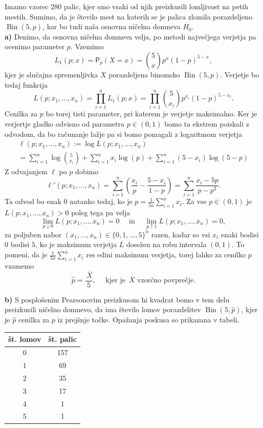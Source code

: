\documentclass[a4paper,11pt]{article}
\newcommand{\olsi}[1]{\,\overline{\!{#1}}} %
\newcommand{\sumin}{\sum_{i = 1}^n}
\DeclareMathOperator{\bin}{Bin}
\begin{document}
Imamo vzorec $280$ palic, kjer smo vsaki od njih preizkusili lomljivost na petih mestih. Sumimo, da je število mest na katerih se je palica zlomila porazdeljeno $\bin(5,p)$, kar bo tudi naša osnovna ničelna domneva $H_0$.
\\

\noindent
\textbf{a)} Denimo, da osnovna ničelna domneva velja, po metodi največjega verjetja pa ocenimo parameter $p$. Vzemimo
\[
    L_1(p; x) = \mathsf{P}_p(X = x) = \binom{5}{x}p^x(1-p)^{5 - x},
\]
kjer je slučajna spremenljivka $X$ porazdeljena binomsko $\bin(5,p)$. Verjetje bo tedaj funkcija
\[
    L(p; x_1, \ldots, x_n) = \prod_{i = 1}^n L_1(p; x) = \prod_{i = 1}^n \binom{5}{x_i}p^{x_i}(1-p)^{5 - x_i}.
\]
Cenilka za $p$ bo torej tisti parameter, pri katerem je verjetje maksimalno. Ker je verjertje gladko odvisno od parametra $p \in (0,1)$ bomo ta ekstrem poiskali z odvodom, da bo računanje lažje pa si bomo pomagali z logaritmom verjetja
\begin{multline*}
    \ell(p; x_1, \ldots, x_n) := 
    \log L(p; x_1, \ldots, x_n) \\ 
    = \sumin \log\binom{5}{x_i} + \sumin x_i\log(p) + \sumin(5 - x_i) \log(5 - p)
\end{multline*}
Z odvajanjem $\ell$ po $p$ dobimo
\[
    \ell'(p; x_1, \ldots, x_n) =
    \sumin \left( \frac{x_i}{p} - \frac{5 - x_i}{1 - p}\right) = 
    \sumin \frac{x_i - 5p}{p - p^2}.
\]
Ta odvod bo enak $0$ natanko tedaj, ko je $p = \frac{1}{5n} \sumin x_i$. Za vse $p \in (0,1)$ je $L(p; x_1, \ldots, x_n) > 0$ poleg tega pa velja
\[
    \lim_{p \downarrow  0} L(p; x_1, \ldots, x_n) = 0 \quad \text{ in } \quad 
    \lim_{p \uparrow  1} L(p; x_1, \ldots, x_n) = 0,
\]
za poljuben nabor $(x_1, \ldots, x_n) \in \{0,1,\ldots, 5\}^n$ razen, kadar so vsi $x_i$ enaki bodisi $0$ bodisi $5$, ko je maksimum verjetja $L$ dosežen na robu intervala $(0,1)$. To pomeni, da je $\frac{1}{5n} \sumin x_i$ res edini maksimum verjetja, torej lahko za cenilko $p$ vzamemo  
\[
    \hat{p} = \frac{\olsi{X}}{5}, \quad \text{ kjer je $\olsi{X}$ vzorčno povprečje.}  
\]

\noindent
\textbf{b)} S posplošenim Pearsonovim preizkusom hi kvadrat \cite[\S 9.5]{Rice} bomo v tem delu preizkusili ničelno domnevo, da ima število lomov porazdelitev $\bin(5,\hat{p})$, kjer je $\hat{p}$ cenilka za $p$ iz prejšnje točke. Opažanja poskusa so prikazana v tabeli. 
\begin{center}
\begin{tabular}{|| c | c ||}
    \hline
    št. lomov & št. palic \\
    \hline 
    \hline 
    0 & 157 \\
    \hline
    1 & 69 \\
    \hline
    2 & 35 \\
    \hline
    3 & 17 \\
    \hline
    4 & 1 \\
    \hline
    5 & 1 \\
    \hline
\end{tabular}
\end{center}
\end{document}
